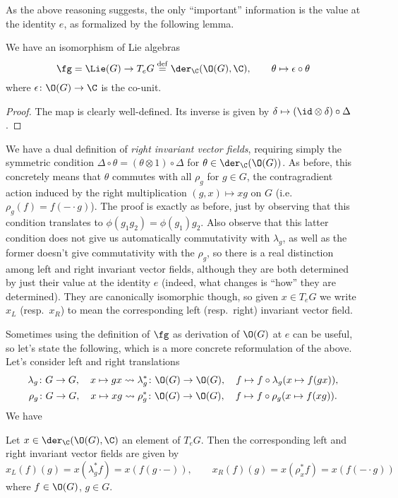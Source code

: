 \documentclass[a4paper, 10pt]{article}
\begin{document}
            As the above reasoning suggests, the only ``important'' information is the value at the identity $e$, as formalized by the following lemma.
            \begin{lemma}
                We have an isomorphism of Lie algebras \[\fg = \Lie(G) \to T_eG \stackrel{\mathrm{def}}{=} \der_{\C}(\O(G), \C), \qquad \theta \mapsto \epsilon \circ \theta \] where $\epsilon\colon \O(G) \to \C$ is the co-unit.
            \end{lemma}
            \begin{proof}
                The map is clearly well-defined. Its inverse is given by $\delta \mapsto (\id \otimes \delta) \circ \Delta$.
            \end{proof}

            We have a dual definition of \emph{right invariant vector fields}, requiring simply the symmetric condition $\Delta \circ \theta = (\theta \otimes 1) \circ \Delta$ for $\theta \in \der_{\C}(\O(G))$. As before, this concretely means that $\theta$ commutes with all $\rho_g$ for $g \in G$, the contragradient action induced by the right multiplication $(g, x) \mapsto xg$ on $G$ (i.e.\ $\rho_g(f) = f(- \cdot g)$). The proof is exactly as before, just by observing that this condition translates to $\phi(g_1g_2) = \phi(g_1)g_2$. Also observe that this latter condition does not give us automatically commutativity with $\lambda_g$, as well as the former doesn't give commutativity with the $\rho_g$, so there is a real distinction among left and right invariant vector fields, although they are both determined by just their value at the identity $e$ (indeed, what changes is ``how'' they are determined). They are canonically isomorphic though, so given $x \in T_eG$ we write $x_L$ (resp.\ $x_R$) to mean the corresponding left (resp.\ right) invariant vector field.

            Sometimes using the definition of $\fg$ as derivation of $\O(G)$ at $e$ can be useful, so let's state the following, which is a more concrete reformulation of the above. Let's consider left and right translations 
            \begin{gather*}
                \lambda_g\colon G \to G,\quad x \mapsto gx \leadsto \lambda_g^*\colon \O(G) \to \O(G), \quad f \mapsto f \circ \lambda_g (x \mapsto f(gx)), \\
                \rho_g\colon G \to G, \quad x \mapsto xg \leadsto \rho_g^*\colon \O(G) \to \O(G), \quad f \mapsto f \circ \rho_g (x \mapsto f(xg)).
            \end{gather*}
            We have
            \begin{lemma}
                Let $x \in \der_{\C}(\O(G), \C)$ an element of $T_eG$. Then the corresponding left and right invariant vector fields are given by \[x_L(f)(g) = x(\lambda_g^*f) = x(f(g \cdot -)), \qquad x_R(f)(g) = x(\rho_x^*f) = x(f(- \cdot g))  \] where $f \in \O(G)$, $g \in G$.
            \end{lemma}
\end{document}

